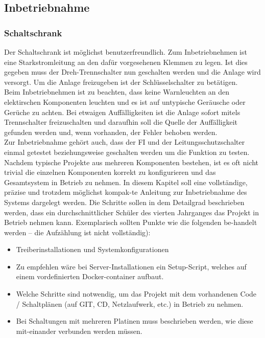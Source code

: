 \newpage

\subsection{Inbetriebnahme}

\subsubsection{Schaltschrank}
    Der Schaltschrank ist möglichst benutzerfreundlich. Zum Inbetriebnehmen ist eine Starkstromleitung an den dafür vorgesehenen Klemmen zu legen. Ist dies gegeben muss der Dreh-Trennschalter nun geschalten werden und die Anlage wird versorgt. Um die Anlage freizugeben ist der Schlüsselschalter zu betätigen.\\
    Beim Inbetriebnehmen ist zu beachten, dass keine Warnleuchten an den elektirschen Komponenten leuchten und es ist auf untypische Geräusche oder Gerüche zu achten. Bei etwaigen Auffälligkeiten ist die Anlage sofort mitels Trennschalter freizuschalten und daraufhin soll die Quelle der Auffälligkeit gefunden werden und, wenn vorhanden, der Fehler behoben werden.\\
    Zur Inbetriebnahme gehört auch, dass der FI und der Leitungsschutzschalter einmal getestet beziehungsweise geschalten werden um die Funktion zu testen.\\
\color{blue}
Nachdem typische Projekte aus mehreren Komponenten bestehen, ist es oft nicht trivial die einzelnen Komponenten korrekt zu konfigurieren und das Gesamtsystem in Betrieb zu nehmen. In diesem Kapitel soll eine vollständige, präzise und trotzdem möglichst kompak-te Anleitung zur Inbetriebnahme des Systems dargelegt werden. Die Schritte sollen in dem Detailgrad beschrieben werden, dass ein durchschnittlicher Schüler des vierten Jahrganges das Projekt in Betrieb nehmen kann. Exemplarisch sollten Punkte wie die folgenden be-handelt werden – die Aufzählung ist nicht vollständig):
\begin{itemize}
    \item Treiberinstallationen und Systemkonfigurationen
    \item Zu empfehlen wäre bei Server-Installationen ein Setup-Script, welches auf einem vordefinierten Docker-container aufbaut.
    \item Welche Schritte sind notwendig, um das Projekt mit dem vorhandenen Code / Schaltplänen (auf GIT, CD, Netzlaufwerk, etc.) in Betrieb zu nehmen.
    \item Bei Schaltungen mit mehreren Platinen muss beschrieben werden, wie diese mit-einander verbunden werden müssen.
\end{itemize}
\color{black}

